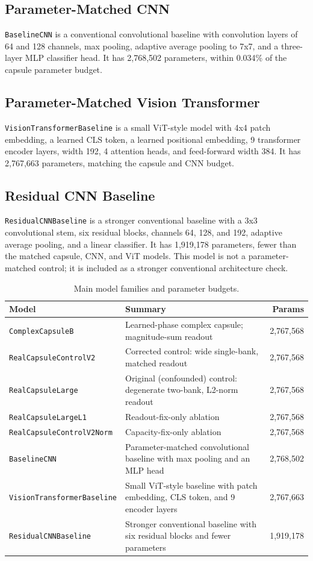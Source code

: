 \documentclass[11pt]{article}
\begin{document}
\subsection{Parameter-Matched CNN}
\texttt{BaselineCNN} is a conventional convolutional baseline with convolution layers of 64 and 128 channels, max pooling, adaptive average pooling to 7x7, and a three-layer MLP classifier head. It has 2{,}768{,}502 parameters, within 0.034\% of the capsule parameter budget.

\subsection{Parameter-Matched Vision Transformer}
\texttt{VisionTransformerBaseline} is a small ViT-style model with 4x4 patch embedding, a learned CLS token, a learned positional embedding, 9 transformer encoder layers, width 192, 4 attention heads, and feed-forward width 384. It has 2{,}767{,}663 parameters, matching the capsule and CNN budget.

\subsection{Residual CNN Baseline}
\texttt{ResidualCNNBaseline} is a stronger conventional baseline with a 3x3 convolutional stem, six residual blocks, channels 64, 128, and 192, adaptive average pooling, and a linear classifier. It has 1{,}919{,}178 parameters, fewer than the matched capsule, CNN, and ViT models. This model is not a parameter-matched control; it is included as a stronger conventional architecture check.

\begin{table}[t]
\centering
\small
\begin{tabularx}{\linewidth}{@{}lXr@{}}
\toprule
Model & Summary & Params \\
\midrule
\texttt{ComplexCapsuleB} & Learned-phase complex capsule; magnitude-sum readout & 2,767,568 \\
\texttt{RealCapsuleControlV2} & Corrected control: wide single-bank, matched readout & 2,767,568 \\
\texttt{RealCapsuleLarge} & Original (confounded) control: degenerate two-bank, L2-norm readout & 2,767,568 \\
\texttt{RealCapsuleLargeL1} & Readout-fix-only ablation & 2,767,568 \\
\texttt{RealCapsuleControlV2Norm} & Capacity-fix-only ablation & 2,767,568 \\
\texttt{BaselineCNN} & Parameter-matched convolutional baseline with max pooling and an MLP head & 2,768,502 \\
\texttt{VisionTransformerBaseline} & Small ViT-style baseline with patch embedding, CLS token, and 9 encoder layers & 2,767,663 \\
\texttt{ResidualCNNBaseline} & Stronger conventional baseline with six residual blocks and fewer parameters & 1,919,178 \\
\bottomrule
\end{tabularx}
\caption{Main model families and parameter budgets.}
\label{tab:models}
\end{table}
\end{document}
